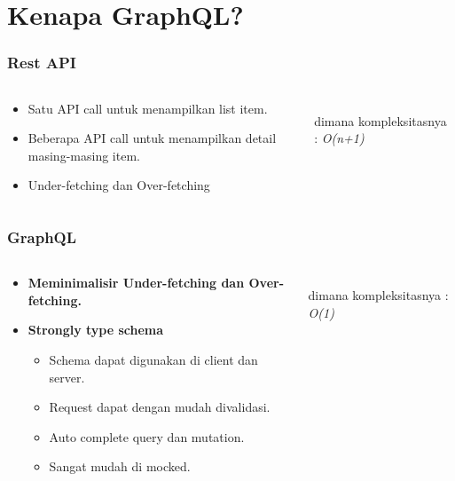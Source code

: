 \documentclass[12pt,xcolor=table]{beamer}
\begin{document}
\section{Kenapa GraphQL?}

\begin{frame}
\frametitle{Rest API}
\begin{columns}
\begin{column}{0.6\textwidth}
    \begin{itemize}
        \item Satu API call untuk menampilkan list item.
        \item Beberapa API call untuk menampilkan detail masing-masing item.
        \item Under-fetching dan Over-fetching
    \end{itemize}
\end{column}
\begin{column}{0.4\textwidth}  %
    \inputminted{bash}{code/rest.text}
    dimana kompleksitasnya : \textit{O(n+1)}
\end{column}
\end{columns}
\end{frame}

\begin{frame}
\frametitle{GraphQL}
\begin{columns}
\begin{column}{0.6\textwidth}
    \begin{itemize}
        \item \textbf{Meminimalisir Under-fetching dan Over-fetching.}
        \item \textbf{Strongly type schema}
            \begin{itemize}
                \item Schema dapat digunakan di client dan server.
                \item Request dapat dengan mudah divalidasi.
                \item Auto complete query dan mutation.
                \item Sangat mudah di mocked.
            \end{itemize}
    \end{itemize}
\end{column}
\begin{column}{0.4\textwidth}  %
    \inputminted{bash}{code/graphql.text}
    dimana kompleksitasnya : \textit{O(1)}
\end{column}
\end{columns}
\end{frame}
\end{document}
